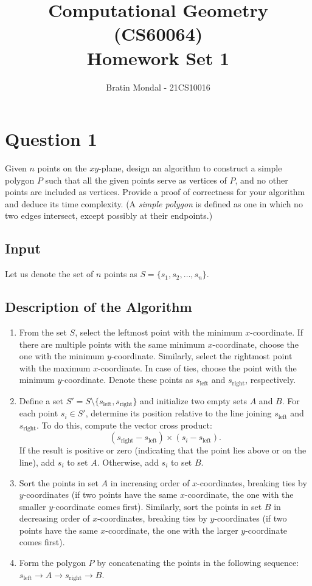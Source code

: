 \documentclass[12pt]{article}
\title{Computational Geometry (CS60064)\\ Homework Set 1}
\author{
    Bratin Mondal - 21CS10016
}
\date{}
\begin{document}
\maketitle

\section*{Question 1}
Given \( n \) points on the \(xy\)-plane, design an algorithm to construct a simple polygon \( P \) such that all the given points serve as vertices of \( P \), and no other points are included as vertices.  Provide a proof of correctness for your algorithm and deduce its time complexity. (A \textit{simple polygon} is defined as one in which no two edges intersect, except possibly at their endpoints.) 

\subsection*{Input} Let us denote the set of \( n \) points as \( S = \{s_1, s_2, \ldots, s_n\} \).

\subsection*{Description of the Algorithm}
\begin{enumerate}
    \item From the set \(S\), select the leftmost point with the minimum \(x\)-coordinate. If there are multiple points with the same minimum \(x\)-coordinate, choose the one with the minimum \(y\)-coordinate. Similarly, select the rightmost point with the maximum \(x\)-coordinate. In case of ties, choose the point with the minimum \(y\)-coordinate. Denote these points as \(s_{\text{left}}\) and \(s_{\text{right}}\), respectively.

    \item Define a set \(S' = S \setminus \{s_{\text{left}}, s_{\text{right}}\}\) and initialize two empty sets \(A\) and \(B\). For each point \(s_i \in S'\), determine its position relative to the line joining \(s_{\text{left}}\) and \(s_{\text{right}}\). To do this, compute the vector cross product:
    \[
    (s_{\text{right}} - s_{\text{left}}) \times (s_i - s_{\text{left}}).
    \]
    If the result is positive or zero (indicating that the point lies above or on the line), add \(s_i\) to set \(A\). Otherwise, add \(s_i\) to set \(B\).

    \item Sort the points in set \(A\) in increasing order of \(x\)-coordinates, breaking ties by \(y\)-coordinates (if two points have the same \(x\)-coordinate, the one with the smaller \(y\)-coordinate comes first). Similarly, sort the points in set \(B\) in decreasing order of \(x\)-coordinates, breaking ties by \(y\)-coordinates (if two points have the same \(x\)-coordinate, the one with the larger \(y\)-coordinate comes first).

    \item Form the polygon \(P\) by concatenating the points in the following sequence: \(s_{\text{left}} \rightarrow A \rightarrow s_{\text{right}} \rightarrow B\).
\end{enumerate}
\end{document}
